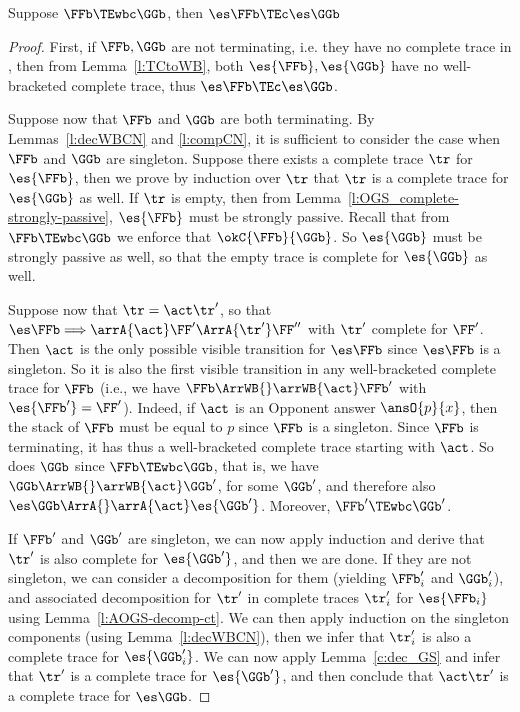 \begin{lemma}
\label{l:mainWBCN}
Suppose 
$\FFb \TEwbc \GGb$,
then
$\es\FFb \TEc \es\GGb$
\end{lemma}              

\begin{proof}
First, if $\FFb,\GGb$ are not terminating, i.e. they have no complete trace in \WBOGS, 
then from Lemma~\ref{l:TCtoWB}, both 
$\es{\FFb},\es{\GGb}$ have no well-bracketed complete trace, thus
$\es\FFb \TEc \es\GGb$. 

Suppose now that $\FFb$ and $\GGb$ are both terminating.
By Lemmas~\ref{l:decWBCN} and \ref{l:compCN}, it is sufficient to consider 
the case when $\FFb$ and $\GGb$ are singleton. 
%
Suppose there exists a complete trace $\tr$ for $\es{\FFb}$, 
then we prove by induction over $\tr$
that $\tr$ is a complete trace for $\es{\GGb}$ as well.
If $\tr$ is empty, then from Lemma~\ref{l:OGS_complete-strongly-passive},
$\es{\FFb}$ must be strongly passive.
Recall that from $\FFb \TEwbc \GGb$ we enforce that
$\okC{\FFb}{\GGb}$.
So $\es{\GGb}$ must be strongly passive as well, so that 
the empty trace is complete for $\es{\GGb}$ as well.

Suppose now that 
$\tr = \act \tr'$, so that
$\es\FFb \Longrightarrow \arrA {\act} \FF' \ArrA{\tr'} \FF''$
with $\tr'$ complete for $\FF'$.
Then $\act$ is the only possible visible transition for $\es\FFb$ 
since $\es\FFb$ is a singleton.
So it is also the first
visible transition in any well-bracketed complete trace for $\FFb$ (i.e., we have 
$\FFb \ArrWB{} \arrWB{\act} \FFb'$ with $\es{\FFb'} = \FF'$). 
Indeed, if $\act$ is an Opponent answer $\ansO{p}{x}$, then the stack
of $\FFb$ must be equal to $p$ since $\FFb$ is a singleton.
Since $\FFb$ is terminating, it has thus a well-bracketed complete
trace starting with $\act$.
%
So does $\GGb$ since 
$\FFb  \TEwbc \GGb$, that is, we have  
$\GGb \ArrWB{} \arrWB{\act} \GGb'$, for some $\GGb'$, and therefore also 
$\es\GGb \ArrA{} \arrA{\act} \es{\GGb'}$. 
% 
Moreover, $\FFb'  \TEwbc \GGb'$.
% 

If $\FFb'$ and $\GGb'$ are singleton, we can now apply induction and 
derive that $\tr'$ is also complete for $\es{\GGb'}$, and then we are done. 
%
If they are not singleton, we can consider a decomposition for them 
(yielding $\FFb'_i$ and $\GGb'_i$), and associated decomposition
for $\tr'$ in complete traces $\tr'_i$ for $\es{\FFb_i}$ using Lemma~\ref{l:AOGS-decomp-ct}. 
We can then apply induction on the singleton components (using
Lemma~\ref{l:decWBCN}), then we infer that 
$\tr'_i$ is also a complete trace for $\es{\GGb_i'}$. 
We can now apply Lemma~\ref{c:dec_GS} and infer that $\tr'$ is a complete trace for $\es{\GGb'}$,
and then conclude that $\act\tr'$ is a complete trace for $\es\GGb$.
\end{proof} 

